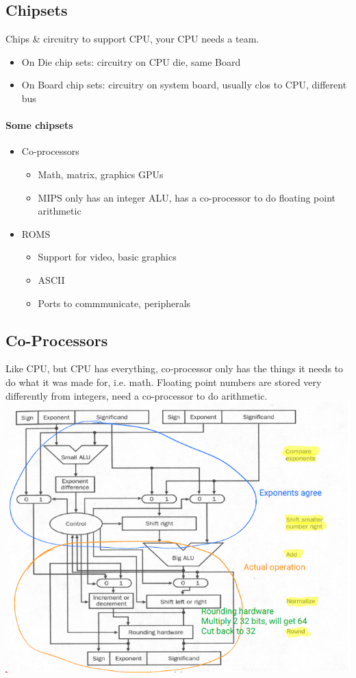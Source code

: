 \documentclass[12 pt]{article}
\begin{document}
\subsection{Chipsets}
Chips \& circuitry to support CPU, your CPU needs a team.
\begin{itemize}
\item On Die chip sets: circuitry on CPU die, same Board
\item On Board chip sets: circuitry on system board, usually clos to CPU, different bus
\end{itemize}
\paragraph{Some chipsets}
\begin{itemize}
\item Co-processors
\begin{itemize}
\item Math, matrix, graphics GPUs
\item MIPS only has an integer ALU, has a co-processor to do floating point arithmetic
\end{itemize}
\item ROMS
\begin{itemize}
\item Support for video, basic graphics
\item ASCII
\item Ports to commmunicate, peripherals
\end{itemize}
\end{itemize}
\subsection{Co-Processors}
Like CPU, but CPU has everything, co-processor only has the things it needs to do what it was made for, i.e. math. Floating point numbers are stored very differently from integers, need a co-processor to do arithmetic.
\\ \includegraphics[scale=0.7]{fpa}
\end{document}
